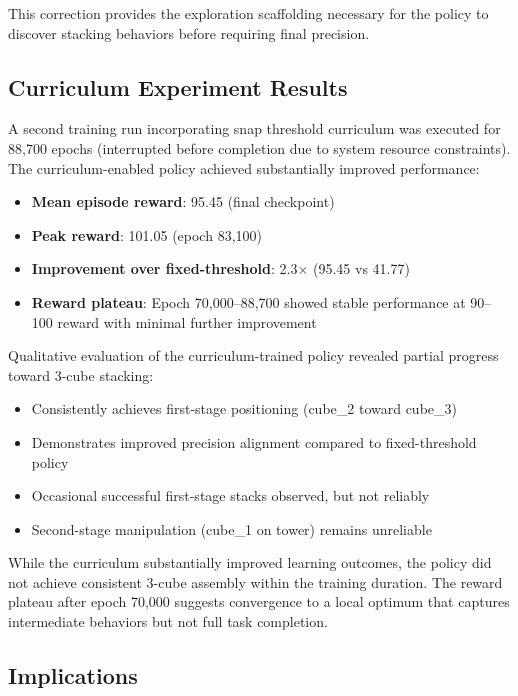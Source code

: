 \documentclass[12pt,a4paper,oneside]{report}
\begin{document}
This correction provides the exploration scaffolding necessary for the policy to discover stacking behaviors before requiring final precision.

\subsection{Curriculum Experiment Results}

A second training run incorporating snap threshold curriculum was executed for 88,700 epochs (interrupted before completion due to system resource constraints). The curriculum-enabled policy achieved substantially improved performance:

\begin{itemize}
    \item \textbf{Mean episode reward}: 95.45 (final checkpoint)
    \item \textbf{Peak reward}: 101.05 (epoch 83,100)
    \item \textbf{Improvement over fixed-threshold}: 2.3$\times$ (95.45 vs 41.77)
    \item \textbf{Reward plateau}: Epoch 70,000--88,700 showed stable performance at 90--100 reward with minimal further improvement
\end{itemize}

Qualitative evaluation of the curriculum-trained policy revealed partial progress toward 3-cube stacking:
\begin{itemize}
    \item Consistently achieves first-stage positioning (cube\_2 toward cube\_3)
    \item Demonstrates improved precision alignment compared to fixed-threshold policy
    \item Occasional successful first-stage stacks observed, but not reliably
    \item Second-stage manipulation (cube\_1 on tower) remains unreliable
\end{itemize}

While the curriculum substantially improved learning outcomes, the policy did not achieve consistent 3-cube assembly within the training duration. The reward plateau after epoch 70,000 suggests convergence to a local optimum that captures intermediate behaviors but not full task completion.

\subsection{Implications}
\end{document}
